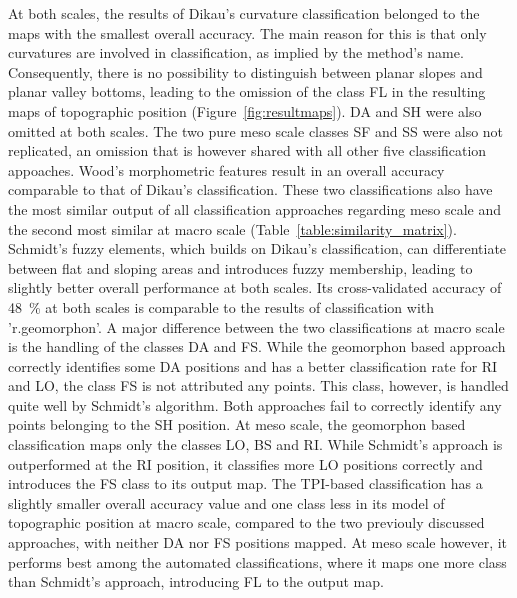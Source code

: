 \documentclass[preprint,12pt,authoryear]{elsarticle}
\begin{document}
At both scales, the results of Dikau's curvature classification belonged to the maps with the smallest overall accuracy. The main reason for this is that only curvatures are involved in classification, as implied by the method's name. Consequently, there is no possibility to distinguish between planar slopes and planar valley bottoms, leading to the omission of the class FL in the resulting maps of topographic position (Figure~\ref{fig:resultmaps}). DA and SH were also omitted at both scales. The two pure meso scale classes SF and SS were also not replicated, an omission that is however shared with all other five classification appoaches. Wood's morphometric features result in an overall accuracy comparable to that of Dikau's classification. These two classifications also have the most similar output of all classification approaches regarding meso scale and the second most similar at macro scale (Table~\ref{table:similarity_matrix}). Schmidt's fuzzy elements, which builds on Dikau's classification, can differentiate between flat and sloping areas and introduces fuzzy membership, leading to slightly better overall performance at both scales. Its cross-validated accuracy of 48~\% at both scales is comparable to the results of classification with 'r.geomorphon'.  A major difference between the two classifications at macro scale is the handling of the classes DA and FS. While the geomorphon based approach correctly identifies some DA positions and has a better classification rate for RI and LO, the class FS is not attributed any points. This class, however, is handled quite well by Schmidt's algorithm. Both approaches fail to correctly identify any points belonging to the SH position. At meso scale, the geomorphon based classification maps only the classes LO, BS and RI. While Schmidt's approach is outperformed at the RI position, it classifies more LO positions correctly and introduces the FS class to its output map. The TPI-based classification has a slightly smaller overall accuracy value and one class less in its model of topographic position at macro scale, compared to the two previouly discussed approaches, with neither DA nor FS positions mapped. At meso scale however, it performs best among the automated classifications, where it maps one more class than Schmidt's approach, introducing FL to the output map. 
\end{document}
